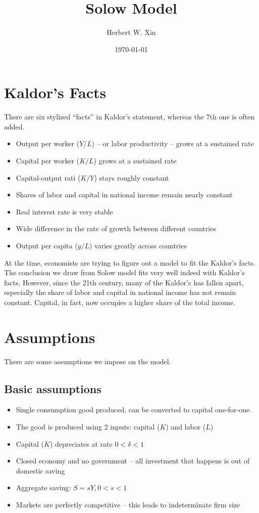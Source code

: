 \documentclass[twocolumn, fleqn]{article}
\begin{document}
	\title{Solow Model}
	\author{Herbert W. Xin}
	\date{\today}
	\maketitle

	\tableofcontents
	\thispagestyle{fancy}

	\section{Kaldor's Facts}
		There are six stylized ``facts'' in Kaldor's statement, whereas the 7th one is often added.
		\begin{itemize}
			\item Output per worker ($Y/L$) -- or labor productivity -- grows at a sustained rate
			\item Capital per worker ($K/L$) grows at a sustained rate
			\item Capital-output rati ($K/Y$) stays roughly constant
			\item Shares of labor and capital in national income remain nearly constant
			\item Real interest rate is very stable
			\item Wide difference in the rate of growth between different countries
			\item Output per capita ($y/L$) varies greatly across countries
		\end{itemize}
		At the time, economists are trying to figure out a model to fit the Kaldor's facts.
		The conclusion we draw from Solow model fits very well indeed with Kaldor's facts.
		However, since the 21th century, many of the Kaldor's has fallen apart, especially the share of labor and
		capital in national income has not remain constant.
		Capital, in fact, now occupies a higher share of the total income.

	\section{Assumptions}
		There are some assumptions we impose on the model.

		\subsection{Basic assumptions}
			\begin{itemize}
				\item Single consumption good produced, can be converted to capital one-for-one.
				\item The good is produced using 2 inputs: capital ($K$) and labor ($L$)
				\item Capital ($K$) depreciates at rate $0<\delta<1$
				\item Closed economy and no government -- all investment that happens is out of domestic saving
				\item Aggregate saving: $S=sY, 0<s<1$
				\item Markets are perfectly competitive -- this leads to indeterminate firm size
			\end{itemize}
\end{document}
